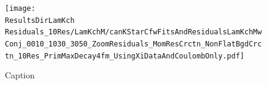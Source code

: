 \documentclass[../AnalysisNoteJBuxton.tex]{subfiles}
\begin{document}

\begin{figure}[h]
  \centering
  \texttt{[image: \\ResultsDirLamKch Residuals\_10Res/LamKchM/canKStarCfwFitsAndResidualsLamKchMwConj\_0010\_1030\_3050\_ZoomResiduals\_MomResCrctn\_NonFlatBgdCrctn\_10Res\_PrimMaxDecay4fm\_UsingXiDataAndCoulombOnly.pdf]}
  \caption[Small Caption]{Caption}
  \label{fig:LamKchMwConjFitsAndResiduals_10Res}
\end{figure}
\end{document}
